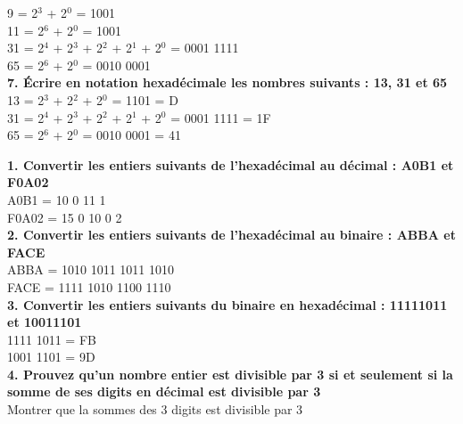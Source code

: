 9 = 2$^{3}$ + 2$^{0}$ = 1001 \\

11 = 2$^{6}$ + 2$^{0}$ = 1001 \\

31 = 2$^{4}$ + 2$^{3}$ + 2$^{2}$ + 2$^{1}$ + 2$^{0}$ = 0001 1111 \\

65 = 2$^{6}$ + 2$^{0}$ = 0010 0001 \\

\textbf{7. Écrire en notation hexadécimale les nombres suivants : 13, 31 et 65} \\

13 = 2$^{3}$ + 2$^{2}$ + 2$^{0}$ = 1101 = D \\

31 = 2$^{4}$ + 2$^{3}$ + 2$^{2}$ + 2$^{1}$ + 2$^{0}$ = 0001 1111 = 1F \\

65 = 2$^{6}$ + 2$^{0}$ = 0010 0001 = 41 \\

\newpage

\textbf{1. Convertir les entiers suivants de l’hexadécimal au décimal : A0B1 et F0A02} \\

A0B1 = 10 0 11 1 \\

F0A02 = 15 0 10 0 2 \\

\textbf{2. Convertir les entiers suivants de l’hexadécimal au binaire : ABBA et FACE} \\

ABBA = 1010 1011 1011 1010 \\

FACE = 1111 1010 1100 1110 \\

\textbf{3. Convertir les entiers suivants du binaire en hexadécimal : 11111011 et 10011101} \\

1111 1011 = FB \\

1001 1101 = 9D \\

\textbf{4. Prouvez qu’un nombre entier est divisible par 3 si et seulement si la somme de ses digits en décimal est divisible par 3} \\

Montrer que la sommes des 3 digits est divisible par 3 \\

